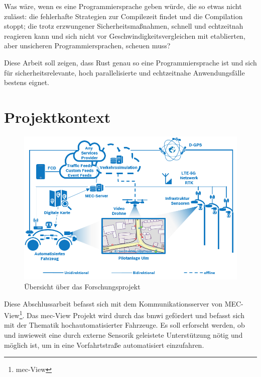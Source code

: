 Was wäre, wenn es eine Programmiersprache geben würde, die so etwas nicht zulässt: die fehlerhafte Strategien zur Compilezeit findet und die Compilation stoppt; die trotz erzwungener Sicherheitsmaßnahmen, schnell und echtzeitnah reagieren kann und sich nicht vor Geschwindigkeitsvergleichen mit etablierten, aber unsicheren Programmiersprachen, scheuen muss?

Diese Arbeit soll zeigen, dass Rust genau so eine Programmiersprache ist und sich für sicherheitsrelevante, hoch parallelisierte und echtzeitnahe Anwendungsfälle bestens eignet.



\clearpage %
\section{Projektkontext}
\begin{figure}[H]
	\label{test 123}
	\centering
	\includegraphics[width=\textwidth]{images/MECView_Arch_de_V1_mod.png}
	\caption[Übersicht über das Forschungsprojekt]{Übersicht über das Forschungsprojekt\protect\footnotemark}
\end{figure}

Diese Abschlussarbeit befasst sich mit dem Kommunikationsserver von MEC-View\footnote{\gls{mec}-View}.
Das \gls{mec}-View Projekt wird durch das \gls{bmwi} gefördert und befasst sich mit der Thematik hochautomatisierter Fahrzeuge.
Es soll erforscht werden, ob und inwieweit eine durch externe Sensorik geleistete Unterstützung nötig und möglich ist, um in eine Vorfahrtstraße automatisiert einzufahren.

